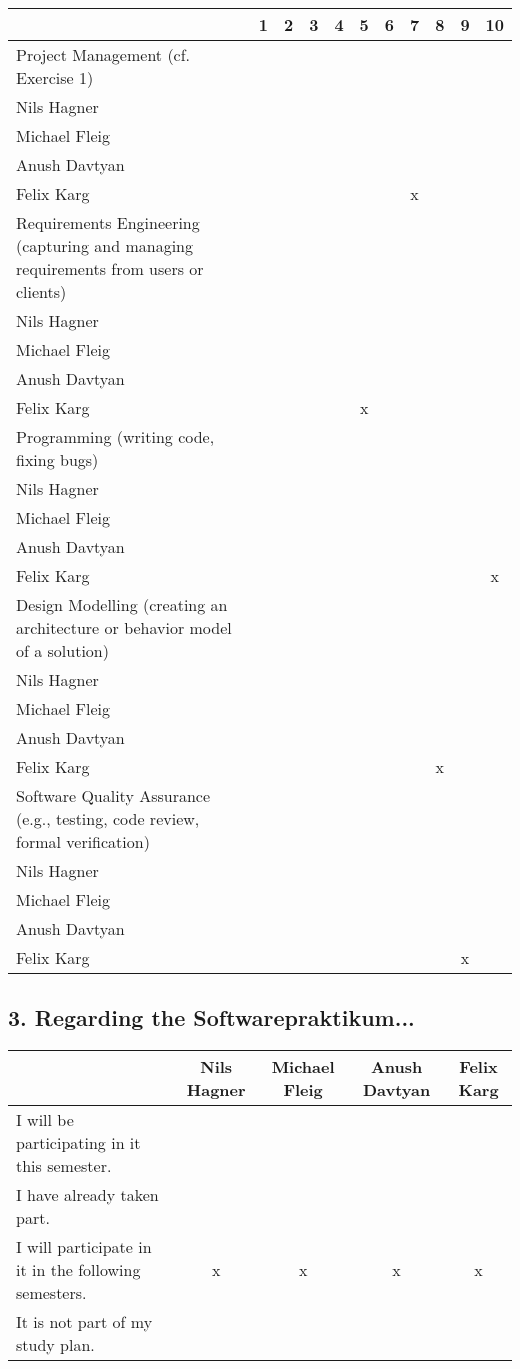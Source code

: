 \documentclass{scrartcl}
\begin{document}
\begin{tabular}{| p{10cm} | c | c | c | c | c | c | c | c | c | c |}
	\hline
	& 1& 2& 3& 4& 5& 6& 7& 8& 9& 10\\
	\hline
	Project Management (cf. Exercise 1) \\
	\hline
	Nils Hagner &&&&&&&&&&\\ \hline
	Michael Fleig &&&&&&&&&&\\ \hline
	Anush Davtyan &&&&&&&&&&\\ \hline
	Felix Karg &&&&&&&x&&&\\ \hline
	Requirements Engineering (capturing and managing requirements from users or clients)\\
	\hline
	Nils Hagner &&&&&&&&&&\\ \hline
	Michael Fleig &&&&&&&&&&\\ \hline
	Anush Davtyan &&&&&&&&&&\\ \hline
	Felix Karg &&&&&x&&&&&\\ \hline
	Programming (writing code, fixing bugs)\\
	\hline
	Nils Hagner &&&&&&&&&&\\ \hline
	Michael Fleig &&&&&&&&&&\\ \hline
	Anush Davtyan &&&&&&&&&&\\ \hline
	Felix Karg &&&&&&&&&&x\\ \hline
	Design Modelling (creating an architecture or behavior model of a solution)\\
	\hline
	Nils Hagner &&&&&&&&&&\\ \hline
	Michael Fleig &&&&&&&&&&\\ \hline
	Anush Davtyan &&&&&&&&&&\\ \hline
	Felix Karg &&&&&&&&x&&\\ \hline
	Software Quality Assurance (e.g., testing, code review, formal verification)\\
	\hline
	Nils Hagner &&&&&&&&&&\\ \hline
	Michael Fleig &&&&&&&&&&\\ \hline
	Anush Davtyan &&&&&&&&&&\\ \hline
	Felix Karg &&&&&&&&&x&\\ \hline
\end{tabular}


\subsection*{3. Regarding the Softwarepraktikum...}
\begin{tabular} {| p{8cm} | c | c | c | c |}
	\hline
	&Nils Hagner&Michael Fleig&Anush Davtyan&Felix Karg\\
	\hline
	I will be participating in it this semester. &&&&\\
	\hline
	I have already taken part. &&&&\\
	\hline
	I will participate in it in the following semesters. &x&x&x&x\\
	\hline
	It is not part of my study plan. &&&&\\
	\hline
\end{tabular}
\end{document}
